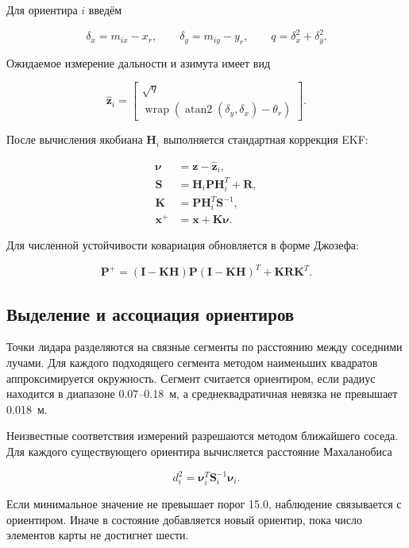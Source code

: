 \documentclass[a4paper,12pt]{article}
\begin{document}
Для ориентира $i$ введём

\[
\delta_x=m_{ix}-x_r,\qquad \delta_y=m_{iy}-y_r,\qquad
q=\delta_x^2+\delta_y^2.
\]

Ожидаемое измерение дальности и азимута имеет вид

\[
\hat{\mathbf{z}}_i=
\begin{bmatrix}
\sqrt{q}\\
\operatorname{wrap}(\operatorname{atan2}(\delta_y,\delta_x)-\theta_r)
\end{bmatrix}.
\]

После вычисления якобиана $\mathbf{H}_i$ выполняется стандартная коррекция EKF:

\[
\begin{aligned}
\boldsymbol{\nu}&=\mathbf{z}-\hat{\mathbf{z}}_i,\\
\mathbf{S}&=\mathbf{H}_i\mathbf{P}\mathbf{H}_i^T+\mathbf{R},\\
\mathbf{K}&=\mathbf{P}\mathbf{H}_i^T\mathbf{S}^{-1},\\
\mathbf{x}^{+}&=\mathbf{x}+\mathbf{K}\boldsymbol{\nu}.
\end{aligned}
\]

Для численной устойчивости ковариация обновляется в форме Джозефа:

\[
\mathbf{P}^{+}=(\mathbf{I}-\mathbf{K}\mathbf{H})\mathbf{P}
(\mathbf{I}-\mathbf{K}\mathbf{H})^{T}+\mathbf{K}\mathbf{R}\mathbf{K}^{T}.
\]

\subsection{Выделение и ассоциация ориентиров}

Точки лидара разделяются на связные сегменты по расстоянию между соседними
лучами. Для каждого подходящего сегмента методом наименьших квадратов
аппроксимируется окружность. Сегмент считается ориентиром, если радиус находится
в диапазоне 0.07--0.18~м, а среднеквадратичная невязка не превышает 0.018~м.

Неизвестные соответствия измерений разрешаются методом ближайшего соседа. Для
каждого существующего ориентира вычисляется расстояние Махаланобиса

\[
d_i^2=\boldsymbol{\nu}_i^T\mathbf{S}_i^{-1}\boldsymbol{\nu}_i.
\]

Если минимальное значение не превышает порог 15.0, наблюдение связывается с
ориентиром. Иначе в состояние добавляется новый ориентир, пока число элементов
карты не достигнет шести.
\end{document}
